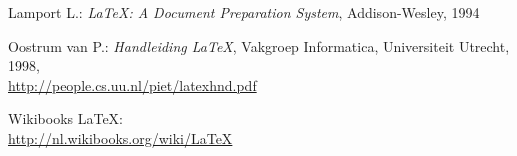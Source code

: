 
\begin{thebibliography}{99}

 Lamport L.: \emph{\LaTeX: A Document Preparation System}, Addison-Wesley, 1994 

 Oostrum van P.: \emph{Handleiding \LaTeX}, Vakgroep
  Informatica, Universiteit Utrecht, 1998,\\ 
  \url{http://people.cs.uu.nl/piet/latexhnd.pdf}

 Wikibooks \LaTeX:\\
  \url{http://nl.wikibooks.org/wiki/LaTeX}

\end{thebibliography}

\vfill
